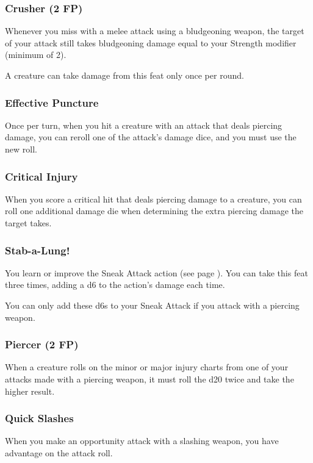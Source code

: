 \subsubsection{Crusher (2 FP)} \label{feat::crusher}
    Whenever you miss with a melee attack using a bludgeoning weapon, the target of your attack still takes bludgeoning damage equal to your Strength modifier (minimum of 2).

    A creature can take damage from this feat only once per round.
\subsubsection{Effective Puncture} \label{feat::effectivepuncture}
    Once per turn, when you hit a creature with an attack that deals piercing damage, you can reroll one of the attack's damage dice, and you must use the new roll.
\subsubsection{Critical Injury} \label{feat::criticalinjury}
    When you score a critical hit that deals piercing damage to a creature, you can roll one additional damage die when determining the extra piercing damage the target takes.
\subsubsection{Stab-a-Lung!} \label{feat::stabalung}
    You learn or improve the Sneak Attack action (see page \pageref{act:sneakattack}).
    You can take this feat three times, adding a d6 to the action's damage each time.

    You can only add these d6s to your Sneak Attack if you attack with a piercing weapon.
\subsubsection{Piercer (2 FP)} \label{feat::piercer}
    When a creature rolls on the minor or major injury charts from one of your attacks made with a piercing weapon, it must roll the d20 twice and take the higher result.
\subsubsection{Quick Slashes} \label{feat::quickslashes}
    When you make an opportunity attack with a slashing weapon, you have advantage on the attack roll.
